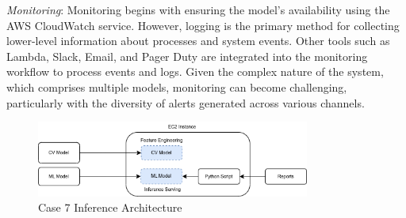 \textit{Monitoring}: Monitoring begins with ensuring the model's availability using the AWS CloudWatch service. However, logging is the primary method for collecting lower-level information about processes and system events. Other tools such as Lambda, Slack, Email, and Pager Duty are integrated into the monitoring workflow to process events and logs. Given the complex nature of the system, which comprises multiple models, monitoring can become challenging, particularly with the diversity of alerts generated across various channels.

\begin{figure}[ht!]
\centering
\includegraphics[width=0.8\textwidth]{images/case7_deployment_process_v2.png}
\caption{Case 7 Inference Architecture}
\label{fig: case7_deployment_process}
\end{figure}
